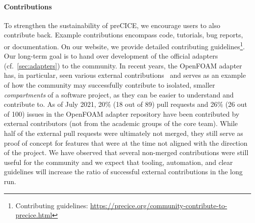 \paragraph{Contributions}
To strengthen the sustainability of preCICE, we encourage users to also contribute back. Example contributions encompass code, tutorials, bug reports, or documentation. On our website, we provide detailed contributing guidelines\footnote{Contributing guidelines: \url{https://precice.org/community-contribute-to-precice.html}}. Our long-term goal is to hand over development of the official adapters (cf.~\autoref{sec:adapters}) to the community. In recent years, the OpenFOAM adapter has, in particular, seen various external contributions~\cite{nlrse19-chourdakis} and serves as an example of how the community may successfully contribute to isolated, smaller \emph{compartments} of a software project, as they can be easier to understand and contribute to. As of July 2021, 20\% (18 out of 89) pull requests and 26\% (26 out of 100) issues in the OpenFOAM adapter repository have been contributed by external contributors (not from the academic groups of the core team). While half of the external pull requests were ultimately not merged, they still serve as proof of concept for features that were at the time not aligned with the direction of the project. We have observed that several non-merged contributions were still useful for the community and we expect that tooling, automation, and clear guidelines will increase the ratio of successful external contributions in the long run.





 
 